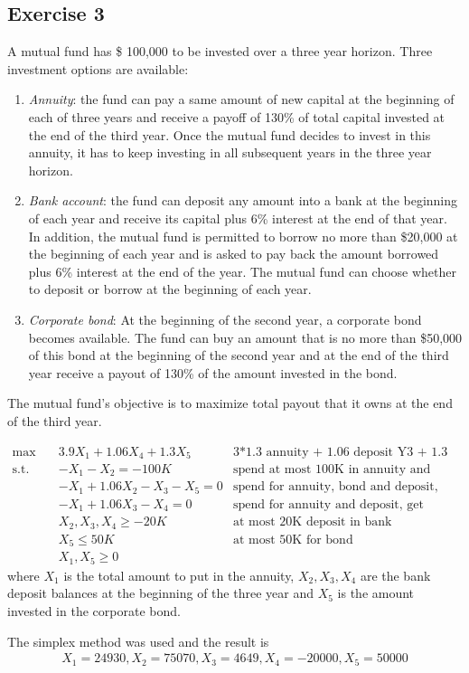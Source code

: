 \subsection{Exercise 3}
A mutual fund has \$ 100,000 to be invested over a three year horizon.
Three investment options are available:
\begin{enumerate}
    \item \textit{Annuity}: the fund can pay a same amount of new capital at the beginning of each of three years and receive a payoff of 130\% of total capital invested at the end of the third year. Once the mutual fund decides to invest in this annuity, it has to keep investing in all subsequent years in the three year horizon.
    \item \textit{Bank account}: the fund can deposit any amount into a bank at the beginning of each year and receive its capital plus 6\% interest at the end of that year. In addition, the mutual fund is permitted to borrow no more than \$20,000 at the beginning of each year and is asked to pay back the amount borrowed plus 6\% interest at the end of the year. The mutual fund can choose whether to deposit or borrow at the beginning of each year.
    \item \textit{Corporate bond}: At the beginning of the second year, a corporate bond becomes available. The fund can buy an amount that is no more than \$50,000 of this bond at the beginning of the second year and at the end of the third year receive a payout of 130\% of the amount invested in the bond.
\end{enumerate}
The mutual fund’s objective is to maximize total payout that it owns at the end of the third year.

\begin{equation}
    \begin{aligned}
        \text{max} \quad  & 3.9X_1 + 1.06X_4 + 1.3X_5       & \text{3*1.3 annuity + 1.06 deposit Y3 + 1.3 bond }         \\
        \text{s.t.} \quad & - X_1 - X_2 = - 100K            & \text{spend at most 100K in annuity and deposit}           \\
                          & - X_1 + 1.06X_2 - X_3 - X_5 = 0 & \text{spend for annuity, bond and deposit, get capital Y1} \\
                          & - X_1 + 1.06X_3 - X_4 = 0       & \text{spend for annuity and deposit, get capital Y2}       \\
                          & X_2, X_3, X_4 \ge -20K          & \text{at most 20K deposit in bank}                         \\
                          & X_5 \leq 50K                    & \text{at most 50K for bond}                                \\
                          & X_1, X_5 \geq 0                 &
    \end{aligned}
\end{equation}
where $X_1$ is the total amount to put in the annuity, $X_2, X_3, X_4$ are the bank deposit balances at the beginning of the three year and $X_5$ is the amount invested in the corporate bond.

The simplex method was used and the result is
\begin{equation}
    \begin{aligned}
        X_1 = 24930, X_2 = 75070, X_3 = 4649, X_4 = -20000, X_5 = 50000
    \end{aligned}
\end{equation}

